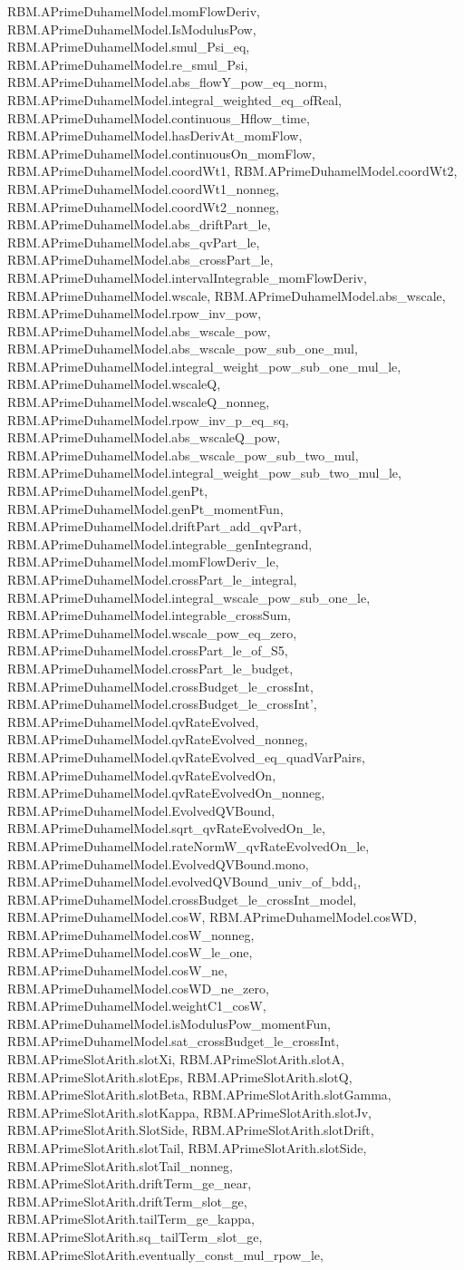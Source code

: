 \begin{theorem}
RBM.APrimeDuhamelModel.momFlowDeriv, RBM.APrimeDuhamelModel.IsModulusPow, RBM.APrimeDuhamelModel.smul_Psi_eq, RBM.APrimeDuhamelModel.re_smul_Psi, RBM.APrimeDuhamelModel.abs_flowY_pow_eq_norm, RBM.APrimeDuhamelModel.integral_weighted_eq_ofReal, RBM.APrimeDuhamelModel.continuous_Hflow_time, RBM.APrimeDuhamelModel.hasDerivAt_momFlow, RBM.APrimeDuhamelModel.continuousOn_momFlow, RBM.APrimeDuhamelModel.coordWt1, RBM.APrimeDuhamelModel.coordWt2, RBM.APrimeDuhamelModel.coordWt1_nonneg, RBM.APrimeDuhamelModel.coordWt2_nonneg, RBM.APrimeDuhamelModel.abs_driftPart_le, RBM.APrimeDuhamelModel.abs_qvPart_le, RBM.APrimeDuhamelModel.abs_crossPart_le, RBM.APrimeDuhamelModel.intervalIntegrable_momFlowDeriv, RBM.APrimeDuhamelModel.wscale, RBM.APrimeDuhamelModel.abs_wscale, RBM.APrimeDuhamelModel.rpow_inv_pow, RBM.APrimeDuhamelModel.abs_wscale_pow, RBM.APrimeDuhamelModel.abs_wscale_pow_sub_one_mul, RBM.APrimeDuhamelModel.integral_weight_pow_sub_one_mul_le, RBM.APrimeDuhamelModel.wscaleQ, RBM.APrimeDuhamelModel.wscaleQ_nonneg, RBM.APrimeDuhamelModel.rpow_inv_p_eq_sq, RBM.APrimeDuhamelModel.abs_wscaleQ_pow, RBM.APrimeDuhamelModel.abs_wscale_pow_sub_two_mul, RBM.APrimeDuhamelModel.integral_weight_pow_sub_two_mul_le, RBM.APrimeDuhamelModel.genPt, RBM.APrimeDuhamelModel.genPt_momentFun, RBM.APrimeDuhamelModel.driftPart_add_qvPart, RBM.APrimeDuhamelModel.integrable_genIntegrand, RBM.APrimeDuhamelModel.momFlowDeriv_le, RBM.APrimeDuhamelModel.crossPart_le_integral, RBM.APrimeDuhamelModel.integral_wscale_pow_sub_one_le, RBM.APrimeDuhamelModel.integrable_crossSum, RBM.APrimeDuhamelModel.wscale_pow_eq_zero, RBM.APrimeDuhamelModel.crossPart_le_of_S5, RBM.APrimeDuhamelModel.crossPart_le_budget, RBM.APrimeDuhamelModel.crossBudget_le_crossInt, RBM.APrimeDuhamelModel.crossBudget_le_crossInt', RBM.APrimeDuhamelModel.qvRateEvolved, RBM.APrimeDuhamelModel.qvRateEvolved_nonneg, RBM.APrimeDuhamelModel.qvRateEvolved_eq_quadVarPairs, RBM.APrimeDuhamelModel.qvRateEvolvedOn, RBM.APrimeDuhamelModel.qvRateEvolvedOn_nonneg, RBM.APrimeDuhamelModel.EvolvedQVBound, RBM.APrimeDuhamelModel.sqrt_qvRateEvolvedOn_le, RBM.APrimeDuhamelModel.rateNormW_qvRateEvolvedOn_le, RBM.APrimeDuhamelModel.EvolvedQVBound.mono, RBM.APrimeDuhamelModel.evolvedQVBound_univ_of_bdd₁, RBM.APrimeDuhamelModel.crossBudget_le_crossInt_model, RBM.APrimeDuhamelModel.cosW, RBM.APrimeDuhamelModel.cosWD, RBM.APrimeDuhamelModel.cosW_nonneg, RBM.APrimeDuhamelModel.cosW_le_one, RBM.APrimeDuhamelModel.cosW_ne, RBM.APrimeDuhamelModel.cosWD_ne_zero, RBM.APrimeDuhamelModel.weightC1_cosW, RBM.APrimeDuhamelModel.isModulusPow_momentFun, RBM.APrimeDuhamelModel.sat_crossBudget_le_crossInt, RBM.APrimeSlotArith.slotXi, RBM.APrimeSlotArith.slotA, RBM.APrimeSlotArith.slotEps, RBM.APrimeSlotArith.slotQ, RBM.APrimeSlotArith.slotBeta, RBM.APrimeSlotArith.slotGamma, RBM.APrimeSlotArith.slotKappa, RBM.APrimeSlotArith.slotJv, RBM.APrimeSlotArith.SlotSide, RBM.APrimeSlotArith.slotDrift, RBM.APrimeSlotArith.slotTail, RBM.APrimeSlotArith.slotSide, RBM.APrimeSlotArith.slotTail_nonneg, RBM.APrimeSlotArith.driftTerm_ge_near, RBM.APrimeSlotArith.driftTerm_slot_ge, RBM.APrimeSlotArith.tailTerm_ge_kappa, RBM.APrimeSlotArith.sq_tailTerm_slot_ge, RBM.APrimeSlotArith.eventually_const_mul_rpow_le, 
\end{theorem}
